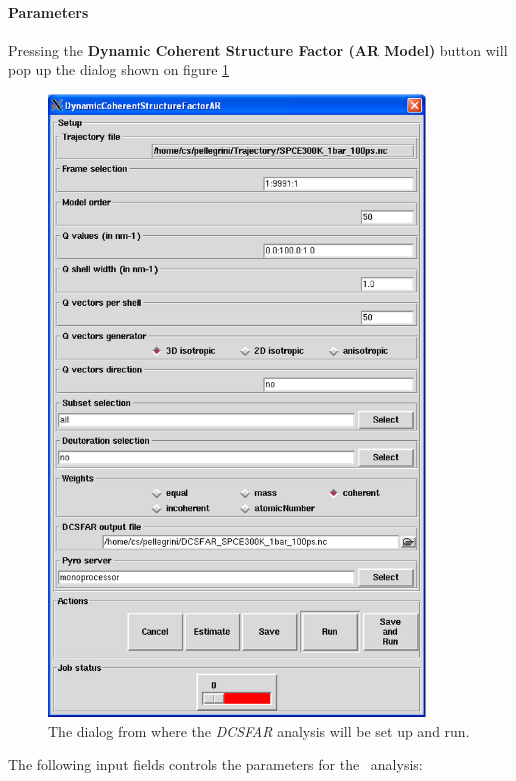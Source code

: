 \documentclass[a4paper,11pt]{report}
\begin{document}
\paragraph{Parameters\\}
\label{dcsfar_parameters}
Pressing the \textbf{Dynamic Coherent Structure Factor (AR Model)} button will pop up the dialog shown on figure 
\ref{fig:dcsfar}
\begin{figure}[h!]
\begin{center}
\includegraphics[width=10cm]{Figures/dcsfar.eps}
\end{center}
\caption[The \textit{DCSFAR} analysis dialog]{The dialog from where the \textit{DCSFAR} analysis will be set up and run.}
\label{fig:dcsfar}
\end{figure}   

The following input fields controls the parameters for the \DCSFAR\ analysis:
\end{document}
